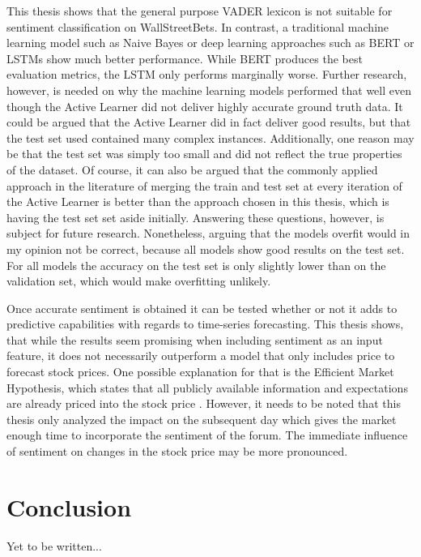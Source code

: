 \documentclass[11pt, a4paper]{article}
\begin{document}
This thesis shows that the general purpose VADER lexicon is not suitable for sentiment classification on WallStreetBets.
In contrast, a traditional machine learning model such as Naive Bayes or deep learning approaches such as BERT or LSTMs
show much better performance. While BERT produces the best evaluation metrics, the LSTM only performs marginally worse.
Further research, however, is needed on why the machine learning models performed that well even 
though the Active Learner did not deliver highly accurate ground truth data. 
It could be argued that the Active Learner did in fact deliver good results, but that the test set used contained many
complex instances. 
Additionally, one reason may be that the test set was simply too small and did not reflect the true properties of the dataset.
Of course, it can also be argued that the commonly applied approach in the literature of merging the train and test set at 
every iteration of the Active Learner is better than the approach chosen in this thesis, which is having the test set set aside initially.
Answering these questions, however, is subject for future research.
Nonetheless, arguing that the models overfit would in my opinion not be correct, because all models show good results on the test set.
For all models the accuracy on the test set is only slightly lower than on the validation set, which would make overfitting unlikely.


Once accurate sentiment is obtained it can be tested whether or not it adds to predictive capabilities with regards to time-series forecasting.
This thesis shows, that while the results seem promising when including sentiment as an input feature, it does not necessarily outperform a
model that only includes price to forecast stock prices. One possible explanation for that is the Efficient Market Hypothesis, which states
that all publicly available information and expectations are already priced into the stock price \citep{fama1970emh}.
However, it needs to be noted that this thesis only analyzed the impact on the subsequent day which gives the market enough time to incorporate
the sentiment of the forum. The immediate influence of sentiment on changes in the stock price may be more pronounced. 



\section{Conclusion}
Yet to be written...
\end{document}
